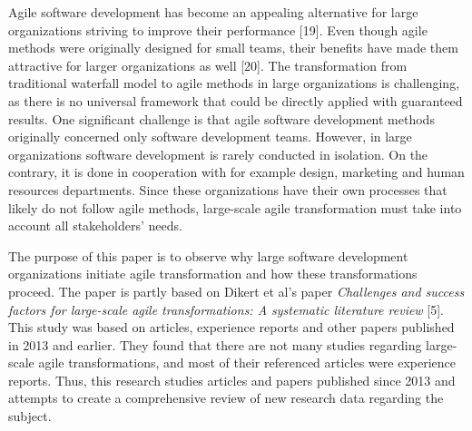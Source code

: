 Agile software development has become an appealing alternative for
large organizations striving to improve their performance [19].
Even though agile methods were originally designed for small teams,
their benefits have made them attractive for larger organizations as
well [20]. The transformation from traditional waterfall model to
agile methods in large organizations is challenging, as there is no
universal framework that could be directly applied with guaranteed
results. One significant challenge is that agile software development
methods originally concerned only software development teams. However,
in large organizations software development is rarely conducted in
isolation. On the contrary, it is done in cooperation with for
example design, marketing and human resources departments. Since these
organizations have their own processes that likely do not follow
agile methods, large-scale agile transformation must take into account
all stakeholders' needs.

The purpose of this paper is to observe why large software
development organizations initiate agile transformation and how these
transformations proceed. The paper is partly based on Dikert et al's
paper \textit{Challenges and success factors for large-scale agile
transformations: A systematic literature review} [5]. This study was
based on articles, experience reports and other papers published in
2013 and earlier. They found that there are not many studies regarding
large-scale agile transformations, and most of their referenced articles
were experience reports. Thus, this research studies articles and papers
published since 2013 and attempts to create a comprehensive review of
new research data regarding the subject.
